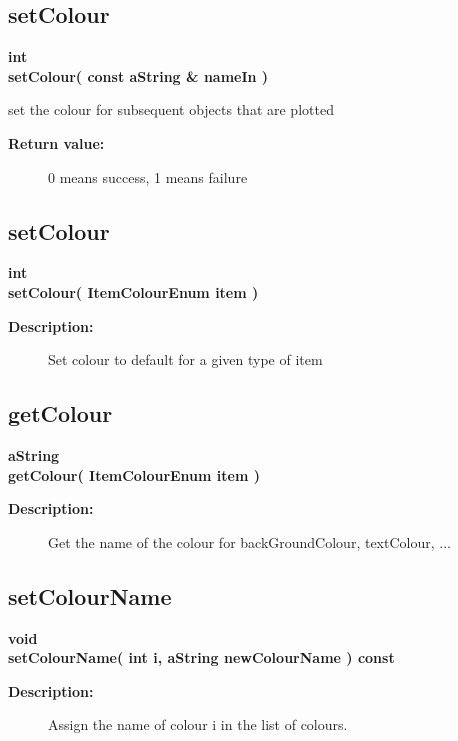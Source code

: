 \subsection{setColour}
 
\begin{flushleft} \textbf{%
int   \\ 
\settowidth{\GLGraphicsInterfaceIncludeArgIndent}{setColour(}%
setColour( const aString \& nameIn )
}\end{flushleft}
  set the colour for subsequent objects that are plotted
\begin{description}
\item[{\bf Return value:}]  0 means success, 1 means failure
\end{description}
\subsection{setColour}
 
\begin{flushleft} \textbf{%
int  \\ 
\settowidth{\GLGraphicsInterfaceIncludeArgIndent}{setColour(}%
setColour( ItemColourEnum item )  
}\end{flushleft}
\begin{description}
\item[{\bf Description:}] 
   Set colour to default for a given type of item
\end{description}
\subsection{getColour}
 
\begin{flushleft} \textbf{%
aString  \\ 
\settowidth{\GLGraphicsInterfaceIncludeArgIndent}{getColour(}%
getColour( ItemColourEnum item )
}\end{flushleft}
\begin{description}
\item[{\bf Description:}]   
   Get the name of the colour for backGroundColour, textColour, ...
\end{description}
\subsection{setColourName}
 
\begin{flushleft} \textbf{%
void  \\ 
\settowidth{\GLGraphicsInterfaceIncludeArgIndent}{setColourName(}%
setColourName( int i, aString newColourName ) const
}\end{flushleft}
\begin{description}
\item[{\bf Description:}]   
     Assign the name of colour i in the list of colours. 
\end{description}

